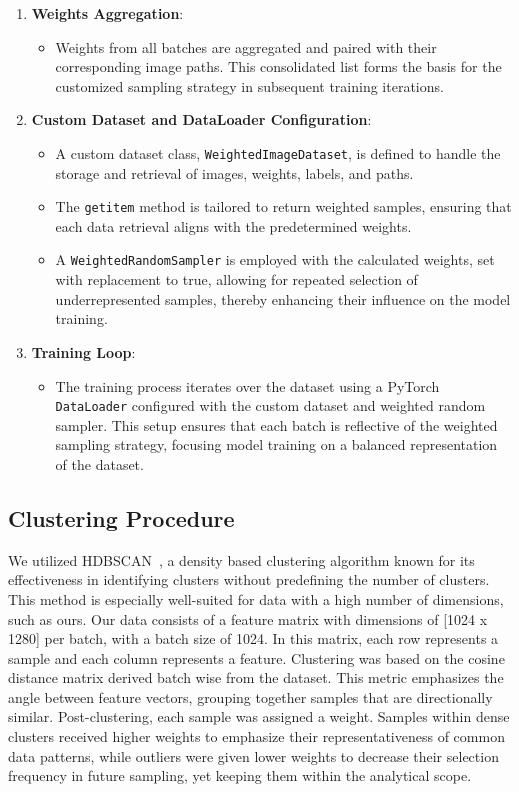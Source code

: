 \begin{enumerate}
    \item \textbf{Weights Aggregation}:
    \begin{itemize}
        \item Weights from all batches are aggregated and paired with their corresponding image paths. This consolidated list forms the basis for the customized sampling strategy in subsequent training iterations.
    \end{itemize}

    \item \textbf{Custom Dataset and DataLoader Configuration}:
    \begin{itemize}
        \item A custom dataset class, \texttt{WeightedImageDataset}, is defined to handle the storage and retrieval of images, weights, labels, and paths.
        \item The \texttt{getitem} method is tailored to return weighted samples, ensuring that each data retrieval aligns with the predetermined weights.
        \item A \texttt{WeightedRandomSampler} is employed with the calculated weights, set with replacement to true, allowing for repeated selection of underrepresented samples, thereby enhancing their influence on the model training.
    \end{itemize}

    \item \textbf{Training Loop}:
    \begin{itemize}
        \item The training process iterates over the dataset using a PyTorch \texttt{DataLoader} configured with the custom dataset and weighted random sampler. This setup ensures that each batch is reflective of the weighted sampling strategy, focusing model training on a balanced representation of the dataset.
    \end{itemize}
\end{enumerate}

\subsection{Clustering Procedure}
We utilized HDBSCAN~\citep{HDBSCAN_algo_campello2013density}, a density based clustering algorithm known for its effectiveness in identifying clusters without predefining the number of clusters. This method is especially well-suited for data with a high number of dimensions, such as ours. Our data consists of a feature matrix with dimensions of [1024 x 1280] per batch, with a batch size of 1024. In this matrix, each row represents a sample and each column represents a feature. Clustering was based on the cosine distance matrix derived batch wise from the dataset. This metric emphasizes the angle between feature vectors, grouping together samples that are directionally similar. Post-clustering, each sample was assigned a weight. Samples within dense clusters received higher weights to emphasize their representativeness of common data patterns, while outliers were given lower weights to decrease their selection frequency in future sampling, yet keeping them within the analytical scope.

